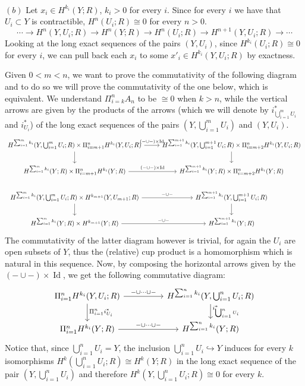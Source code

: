 \documentclass{article}
\DeclareMathOperator{\Id}{Id}
\begin{document}
~\\
\proof $(b)$ Let $x_i\in H^{k_i}(Y;R)$, $k_i>0$ for every $i$. Since for every $i$ we
have that $U_i\subset Y$ is contractible, $H^n(U_i;R)\cong 0$ for every $n>0$.
$$\cdots\rightarrow H^n(Y,U_i;R)\rightarrow H^n(Y;R)\rightarrow
H^n(U_i;R)\rightarrow H^{n+1}(Y,U_i;R)\rightarrow\cdots$$
Looking at the long exact sequences of the pairs $(Y,U_i)$, since
$H^{k_i}(U_i;R)\cong 0$ for every $i$, we can pull back each $x_i$ to some $x'_i
\in H^{k_i}(Y,U_i;R)$ by exactness.

Given $0<m<n$, we want to prove the commutativity of the following diagram and
to do so we will prove the commutativity of the one below, which is equivalent.
We understand $\Pi_{i=k}^n A_n$ to be $\cong 0$ when $k>n$, while the vertical
arrows are given by the products of the arrows (which we will denote by
$i^*_{\bigcup_{i=1}^m U_i}$ and $i^*_{U_i}$) of the long exact sequences of the
pairs $(Y,\bigcup_{i=1}^m U_i)$ and $(Y,U_i)$.
\[
    \begin{tikzcd}
        H^{\sum_{i=1}^m k_i}(Y,\bigcup_{i=1}^m U_i;R)\times\Pi_{i=m+1}^n
        H^{k_i}(Y,U_i;R)\arrow{r}{(-\cup-)\times\Id}\arrow{d}
        & H^{\sum_{i=1}^{m+1} k_i}(Y,\bigcup_{i=1}^{m+1}
        U_i;R)\times\Pi_{i=m+2}^n H^{k_i}(Y,U_i;R)\arrow{d} \\
        H^{\sum_{i=1}^m k_i}(Y;R)\times\Pi_{i=m+1}^n
        H^{k_i}(Y;R)\arrow{r}{(-\cup-)\times\Id}
        & H^{\sum_{i=1}^{m+1} k_i}(Y;R)\times\Pi_{i=m+2}^n H^{k_i}(Y;R) \\
        H^{\sum_{i=1}^m k_i}(Y,\bigcup_{i=1}^m U_i;R)\times
        H^{k_{m+1}}(Y,U_{m+1};R)\arrow{r}{-\cup-}\arrow{d}
        & H^{\sum_{i=1}^{m+1} k_i}(Y,\bigcup_{i=1}^{m+1} U_i;R)\arrow{d} \\
        H^{\sum_{i=1}^m k_i}(Y;R)\times H^{k_{m+1}}(Y;R)\arrow{r}{-\cup-}
        & H^{\sum_{i=1}^{m+1} k_i}(Y;R)
    \end{tikzcd}
\]
The commutativity of the latter diagram however is trivial, for again the $U_i$
are open subsets of $Y$, thus the (relative) cup product is a homomorphism which
is natural in this sequence. Now, by composing the horizontal arrows given by
the $(-\cup-)\times\Id$, we get the following commutative diagram:
\[
    \begin{tikzcd}
        \Pi_{i=1}^n
        H^{k_i}(Y,U_i;R)\arrow{rr}{-\cup\cdots\cup-}\arrow{d}{\Pi_{i=1}^n
        i^*_{U_i}}
        && H^{\sum_{i=1}^n k_i}(Y,\bigcup_{i=1}^n
        U_i;R)\arrow{d}{i^*_{\bigcup_{i=1}^n U_i}} \\
        \Pi_{i=1}^n H^{k_i}(Y;R)\arrow{rr}{-\cup\cdots\cup-}
        && H^{\sum_{i=1}^n k_i}(Y;R)
    \end{tikzcd}
\]
Notice that, since $\bigcup_{i=1}^n U_i=Y$, the inclusion $\bigcup_{i=1}^n
U_i\hookrightarrow Y$ induces for every $k$ isomorphisms $H^k(\bigcup_{i=1}^n
U_i;R)\cong H^k(Y;R)$ in the long exact sequence of the pair
$(Y,\bigcup_{i=1}^n U_i)$ and therefore $H^k(Y,\bigcup_{i=1}^n U_i;R)\cong 0$
for every $k$.
\end{document}
